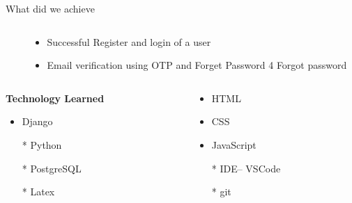 \documentclass [] {beamer}
\begin{document}
\begin{frame}{What did we achieve}
\begin{columns}
\begin{column}{0.48\textwidth}
    \end{column}
    \begin{column}{0.48\textwidth}
\begin{itemize}
    \item Successful Register and login of a user
    \item Email verification using OTP and Forget Password
4 Forgot password
\end{itemize}
    \end{column}
\end{columns}
\begin{columns}
    \begin{column}{0.48\textwidth}
        \textbf{Technology Learned }
        \begin{itemize}
            \item Django
            \item[*] Python
            \item[*] PostgreSQL
            \item[*] Latex
        \end{itemize}
    \end{column}
    \begin{column}{0.48\textwidth}
        \begin{itemize}
            \item HTML
            \item CSS
            \item JavaScript
            
            \item[*] IDE-- VSCode
            \item[*] git
            
        \end{itemize}
    \end{column}
    
\end{columns}

    
\end{frame}
\end{document}
